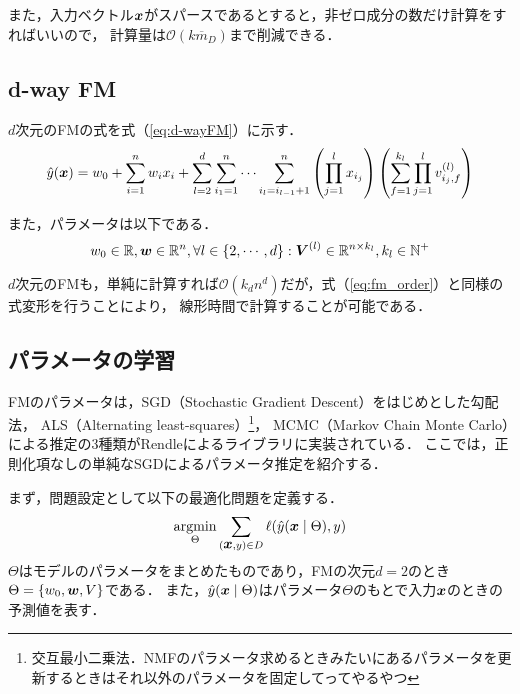 また，入力ベクトル$\mbox{\boldmath $x$}$がスパースであるとすると，非ゼロ成分の数だけ計算をすればいいので，
計算量は$\mathcal{O}(k\overline{m}_{D})$まで削減できる．

\subsection{d-way FM}
$d$次元のFMの式を式（\ref{eq:d-wayFM}）に示す．
\begin{equation}
  \hat{y}(\mbox{\boldmath $x$}) = w_{0} +
  \sum_{i=1}^{n} w_{i} x_{i} +
  \sum_{l=2}^{d} \sum_{i_{1}=1}^{n} \cdots \sum_{i_{l}=i_{l-1}+1}^{n}
  \left ( \prod_{j=1}^{l} x_{i_{j}}  \right )
  \left ( \sum_{f=1}^{k_{l}} \prod_{j=1}^{l} v_{i_{j}, f}^{(l)} \right ) \label{eq:d-wayFM}
\end{equation}

また，パラメータは以下である．
\begin{equation}
    w_{0} \in \mathbb{R}, \mbox{\boldmath $w$} \in \mathbb{R}^{n}, \forall l \in \{2, \cdots, d \} : \mbox{\boldmath $V$}^{(l)} \in \mathbb{R}^{n \times k_{l}}, k_{l} \in \mathbb{N}^{+}
\end{equation}

$d$次元のFMも，単純に計算すれば$\mathcal{O}(k_{d}n^{d})$だが，式（\ref{eq:fm_order}）と同様の式変形を行うことにより，
線形時間で計算することが可能である．

\subsection{パラメータの学習}
FMのパラメータは，SGD（Stochastic Gradient Descent）をはじめとした勾配法，
ALS（Alternating least-squares）\footnote{交互最小二乗法．NMFのパラメータ求めるときみたいにあるパラメータを更新するときはそれ以外のパラメータを固定してってやるやつ}，
MCMC（Markov Chain Monte Carlo）による推定の3種類がRendleによるライブラリに実装されている\cite{Rendle:2012:FML:2168752.2168771}．
ここでは，正則化項なしの単純なSGDによるパラメータ推定を紹介する．

まず，問題設定として以下の最適化問題を定義する．
\begin{equation}
  \argmin_{\Theta} \sum_{(\vtr{x}, y) \in D} \ell(\hat{y}(\vtr{x} \mid \Theta), y)
\end{equation}
$\Theta$はモデルのパラメータをまとめたものであり，FMの次元$d=2$のとき$\Theta = \{ w_{0}, \mbox{\boldmath $w$}, V \}$である．
また，$\hat{y}(\mbox{\boldmath $x$} \mid \Theta)$はパラメータ$\Theta$のもとで入力$\mbox{\boldmath $x$}$のときの予測値を表す．

